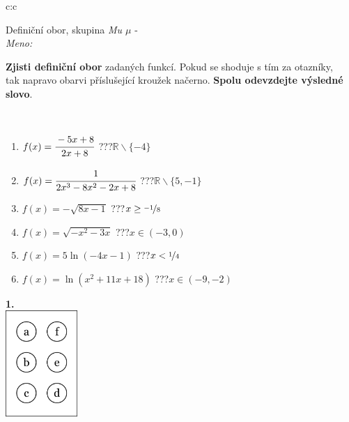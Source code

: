 \documentclass[10pt]{report}
\begin{document}
\begin{tabular}{c:c}
\begin{minipage}[c][104.5mm][t]{0.5\linewidth}
\begin{center}
\vspace{7mm}
{\huge Definiční obor, skupina \textit{Mu $\mu$} -}\\[5mm]
\textit{Meno:}\phantom{xxxxxxxxxxxxxxxxxxxxxxxxxxxxxxxxxxxxxxxxxxxxxxxxxxxxxxxxxxxxxxxxx}\\[5mm]
\begin{minipage}{0.95\linewidth}
\textbf{Zjisti definiční obor} zadaných funkcí. Pokud se shoduje s tím za otazníky,\\tak napravo obarvi příslušející kroužek načerno. \textbf{Spolu odevzdejte výsledné slovo}.
\end{minipage}
\\[1mm]
\begin{minipage}{0.79\linewidth}
\begin{center}
\begin{varwidth}{\linewidth}
\begin{enumerate}
\normalsizerrr
\item $f(x)=\cfrac{-5x+8}{2x+8}$\quad \dotfill\; ???\;\dotfill \quad $\mathbb{R}\smallsetminus\{-4\}$
\item $f(x)=\cfrac{1}{2x^3-8x^2-2x+8}$\quad \dotfill\; ???\;\dotfill \quad $\mathbb{R}\smallsetminus\{5,-1\}$
\item $f(x)=-\sqrt{8x-1}$\quad \dotfill\; ???\;\dotfill \quad $x\geq\nicefrac{-1}{8}$
\item $f(x)=\sqrt{-x^2-3x}$\quad \dotfill\; ???\;\dotfill \quad $x\in(-3 , 0)$
\item $f(x)=5\ln{(-4x-1)}$\quad \dotfill\; ???\;\dotfill \quad $x<\nicefrac{1}{4}$
\item $f(x)=\ln{(x^2+11x+18)}$\quad \dotfill\; ???\;\dotfill \quad $x\in(-9 , -2)$
\end{enumerate}
\end{varwidth}
\end{center}
\end{minipage}
\begin{minipage}{0.20\linewidth}
\begin{center}
{\Huge\bfseries 1.} \\[2mm]
\includegraphics[height=40mm]{../images/braille.png}

\end{center}
\end{minipage}
\end{center}
\end{minipage}
\end{tabular}
\end{document}
